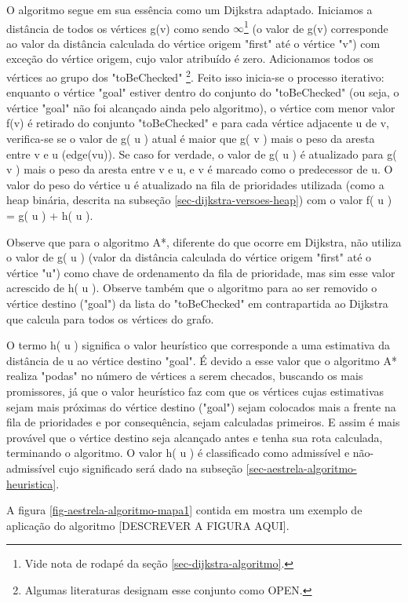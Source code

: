 O algoritmo segue em sua essência como um Dijkstra adaptado. Iniciamos a distância de todos os vértices g(v) como sendo $\infty$\footnote{Vide nota de rodapé da seção \ref{sec-dijkstra-algoritmo}.} (o valor de g(v) corresponde ao valor da distância calculada do vértice origem "first" até o vértice "v") com exceção do vértice origem, cujo valor atribuído é zero. Adicionamos todos os vértices ao grupo dos "toBeChecked" \footnote{Algumas literaturas designam esse conjunto como OPEN.}. Feito isso inicia-se o processo iterativo: enquanto o vértice "goal" estiver dentro do conjunto do "toBeChecked" (ou seja, o vértice "goal" não foi alcançado ainda pelo algoritmo), o vértice com menor valor f(v) é retirado do conjunto "toBeChecked" e para cada vértice adjacente u de v, verifica-se se o valor de g( u ) atual é maior que g( v ) mais o peso da aresta entre v e u (edge(vu)). Se caso for verdade, o valor de g( u ) é atualizado para g( v ) mais o peso da aresta entre v e u, e v é marcado como o predecessor de u. O valor do peso do vértice u é atualizado na fila de prioridades utilizada (como a heap binária, descrita na subseção \ref{sec-dijkstra-versoes-heap}) com o valor f( u ) = g( u ) + h( u ).

Observe que para o algoritmo A*, diferente do que ocorre em Dijkstra, não utiliza o valor de g( u ) (valor da distância calculada do vértice origem "first" até o vértice "u") como chave de ordenamento da fila de prioridade, mas sim esse valor acrescido de h( u ). Observe também que o algoritmo para ao ser removido o vértice destino ("goal") da lista do "toBeChecked" em contrapartida ao Dijkstra que calcula para todos os vértices do grafo.

O termo h( u ) significa o valor heurístico que corresponde a uma estimativa da distância de u ao vértice destino "goal". É devido a esse valor que o algoritmo A* realiza "podas" no número de vértices a serem checados, buscando os mais promissores, já que o valor heurístico faz com que os vértices cujas estimativas sejam mais próximas do vértice destino ("goal") sejam colocados mais a frente na fila de prioridades e por consequência, sejam calculadas primeiros. E assim é mais provável que o vértice destino seja alcançado antes e tenha sua rota calculada, terminando o algoritmo. O valor h( u ) é classificado como admissível e não-admissível cujo significado será dado na subseção \ref{sec-aestrela-algoritmo-heuristica}.

A figura \ref{fig-aestrela-algoritmo-mapa1} contida em  mostra um exemplo de aplicação do algoritmo [DESCREVER A FIGURA AQUI].

